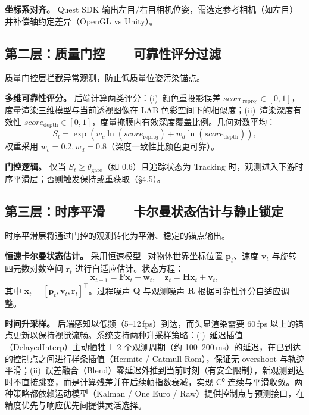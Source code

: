 \documentclass[review]{vgtc}
\begin{document}
\noindent\textbf{坐标系对齐。} Quest SDK 输出左目/右目相机位姿，需选定参考相机（如左目）并补偿轴约定差异（OpenGL vs Unity）。

\subsection{第二层：质量门控——可靠性评分过滤}

质量门控层拦截异常观测，防止低质量位姿污染锚点。

\noindent\textbf{多维可靠性评分。} 后端计算两类评分：(i)~颜色重投影误差 $\mathit{score}_{\text{reproj}} \in [0,1]$，度量渲染三维模型与当前透视图像在 LAB 色彩空间下的相似度；(ii)~渲染深度有效性 $\mathit{score}_{\text{depth}} \in [0,1]$，度量掩膜内有效深度覆盖比例。几何对数平均：
\begin{equation}
  S_t = \exp\!\left(w_c\ln(\mathit{score}_{\text{reproj}}) + w_d\ln(\mathit{score}_{\text{depth}})\right),
  \label{eq:reliability}
\end{equation}
权重采用 $w_c=0.2, w_d=0.8$（深度一致性比颜色更可靠）。

\noindent\textbf{门控逻辑。} 仅当 $S_t \geq \theta_{\text{gate}}$（如 0.6）且追踪状态为 Tracking 时，观测进入下游时序平滑层；否则触发保持或重获取（§4.5）。

\subsection{第三层：时序平滑——卡尔曼状态估计与静止锁定}

时序平滑层将通过门控的观测转化为平滑、稳定的锚点输出。

\noindent\textbf{恒速卡尔曼状态估计。} 采用恒速模型~\cite{kalman1960new} 对物体世界坐标位置 $\mathbf{p}_t$、速度 $\mathbf{v}_t$ 与旋转四元数对数空间 $\mathbf{r}_t$ 进行自适应估计。状态方程：
\begin{equation}
  \mathbf{x}_{t+1} = \mathbf{F}\mathbf{x}_t + \mathbf{w}_t, \quad \mathbf{z}_t = \mathbf{H}\mathbf{x}_t + \mathbf{v}_t,
\end{equation}
其中 $\mathbf{x}_t = [\mathbf{p}_t, \mathbf{v}_t, \mathbf{r}_t]^\top$。过程噪声 $\mathbf{Q}$ 与观测噪声 $\mathbf{R}$ 根据可靠性评分自适应调整。

\noindent\textbf{时间升采样。} 后端感知以低频（5--12\,fps）到达，而头显渲染需要 60\,fps 以上的锚点更新以保持视觉流畅。系统支持两种升采样策略：(i)~延迟插值（DelayedInterp）主动牺牲 1--2 个观测周期（约 100--200\,ms）的延迟，在已到达的控制点之间进行样条插值（Hermite / Catmull-Rom），保证无 overshoot 与轨迹平滑；(ii)~误差融合（Blend）零延迟外推到当前时刻（有安全限制），新观测到达时不直接跳变，而是计算残差并在后续帧指数衰减，实现 C⁰ 连续与平滑收敛。两种策略都依赖运动模型（Kalman / One Euro / Raw）提供控制点与预测接口，在精度优先与响应优先间提供灵活选择。
\end{document}
